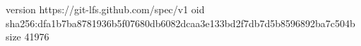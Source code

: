 version https://git-lfs.github.com/spec/v1
oid sha256:dfa1b7ba8781936b5f07680db6082dcaa3e133bd2f7db7d5b8596892ba7c504b
size 41976
